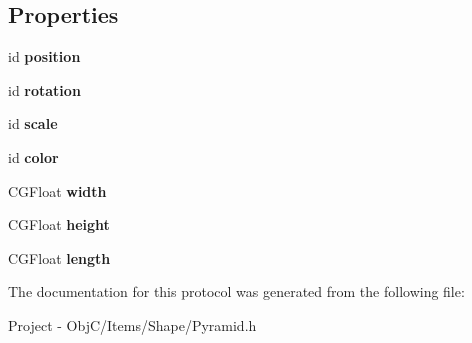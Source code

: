 \subsection*{Properties}
\begin{DoxyCompactItemize}
\item 
\hypertarget{protocol_pyramid_export-p_a817dd1c42fb136baec9ae7c15f78028e}{}id {\bfseries position}\label{protocol_pyramid_export-p_a817dd1c42fb136baec9ae7c15f78028e}

\item 
\hypertarget{protocol_pyramid_export-p_a3601cdb01a80c4dd6b3ed86160935c4f}{}id {\bfseries rotation}\label{protocol_pyramid_export-p_a3601cdb01a80c4dd6b3ed86160935c4f}

\item 
\hypertarget{protocol_pyramid_export-p_a153ed3aa9def3c2a366443a728fc3e1d}{}id {\bfseries scale}\label{protocol_pyramid_export-p_a153ed3aa9def3c2a366443a728fc3e1d}

\item 
\hypertarget{protocol_pyramid_export-p_a828bb9c1b0dce2109b5fa1a7a78b89b3}{}id {\bfseries color}\label{protocol_pyramid_export-p_a828bb9c1b0dce2109b5fa1a7a78b89b3}

\item 
\hypertarget{protocol_pyramid_export-p_ad537c28a178ebc016dd1f98088d6bb10}{}C\+G\+Float {\bfseries width}\label{protocol_pyramid_export-p_ad537c28a178ebc016dd1f98088d6bb10}

\item 
\hypertarget{protocol_pyramid_export-p_a6bae2c1a0969beb9904d825aaa415af8}{}C\+G\+Float {\bfseries height}\label{protocol_pyramid_export-p_a6bae2c1a0969beb9904d825aaa415af8}

\item 
\hypertarget{protocol_pyramid_export-p_a8b54e4124c53daee87b17dbf7ff4381a}{}C\+G\+Float {\bfseries length}\label{protocol_pyramid_export-p_a8b54e4124c53daee87b17dbf7ff4381a}

\end{DoxyCompactItemize}


The documentation for this protocol was generated from the following file\+:\begin{DoxyCompactItemize}
\item 
Project -\/ Obj\+C/\+Items/\+Shape/Pyramid.\+h\end{DoxyCompactItemize}
